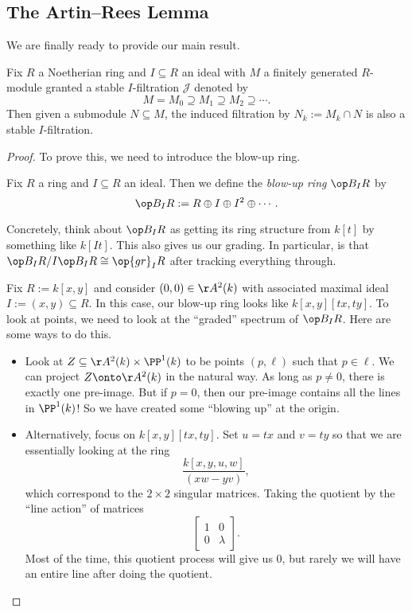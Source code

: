 \subsection{The Artin--Rees Lemma}
We are finally ready to provide our main result.
\begin{theorem}
	Fix $R$ a Noetherian ring and $I\subseteq R$ an ideal with $M$ a finitely generated $R$-module granted a stable $I$-filtration $\mathcal J$ denoted by
	\[M=M_0\supseteq M_1\supseteq M_2\supseteq\cdots.\]
	Then given a submodule $N\subseteq M$, the induced filtration by $N_k:=M_k\cap N$ is also a stable $I$-filtration.
\end{theorem}
\begin{proof}
	To prove this, we need to introduce the blow-up ring.
	\begin{definition}
		Fix $R$ a ring and $I\subseteq R$ an ideal. Then we define the \textit{blow-up ring} $\op B_IR$ by
		\[\op B_IR:=R\oplus I\oplus I^2\oplus\cdots.\]
	\end{definition}
	Concretely, think about $\op B_IR$ as getting its ring structure from $k[t]$ by something like $k[It]$. This also gives us our grading. In particular, is that $\op B_IR/I\op B_IR\cong\op{gr}_IR$ after tracking everything through.
	\begin{ex}
		Fix $R:=k[x,y]$ and consider $(0,0)\in\AA^2(k)$ with associated maximal ideal $I:=(x,y)\subseteq R$. In this case, our blow-up ring looks like $k[x,y][tx,ty]$. To look at points, we need to look at the ``graded'' spectrum of $\op B_IR$. Here are some ways to do this.
		\begin{itemize}
			\item Look at $Z\subseteq\AA^2(k)\times\PP^1(k)$ to be points $(p,\ell)$ such that $p\in\ell$. We can project $Z\onto\AA^2(k)$ in the natural way. As long as $p\ne0$, there is exactly one pre-image. But if $p=0$, then our pre-image contains all the lines in $\PP^1(k)$! So we have created some ``blowing up'' at the origin.
			\item Alternatively, focus on $k[x,y][tx,ty]$. Set $u=tx$ and $v=ty$ so that we are essentially looking at the ring
			\[\frac{k[x,y,u,w]}{(xw-yv)},\]
			which correspond to the $2\times2$ singular matrices. Taking the quotient by the ``line action'' of matrices
			\[\begin{bmatrix}
				1 & 0 \\
				0 & \lambda
			\end{bmatrix}.\]
			Most of the time, this quotient process will give us $0$, but rarely we will have an entire line after doing the quotient.

\end{itemize}
\end{ex}
\end{proof}
